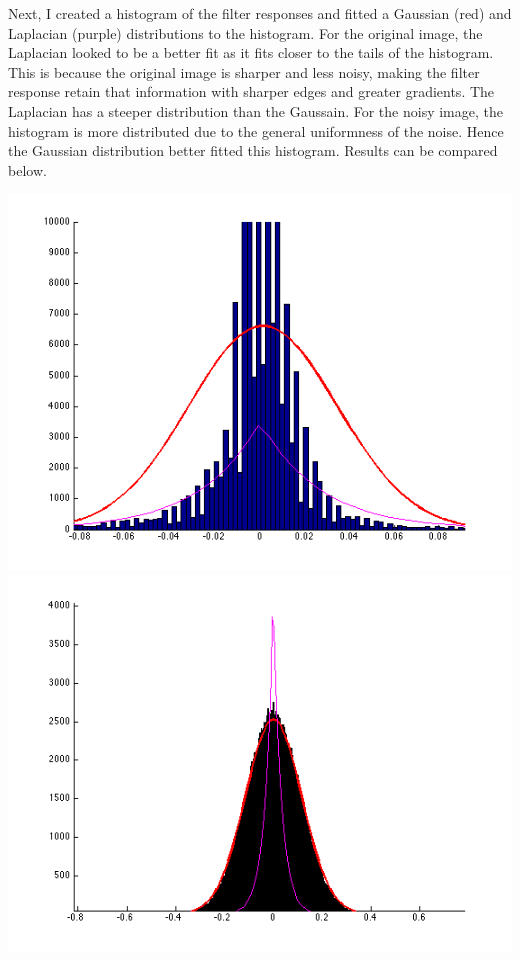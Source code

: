 \documentclass[12pt,twoside]{article}
\begin{document}
Next, I created a histogram of the filter responses and fitted a Gaussian (red) and Laplacian (purple) distributions to the histogram.  For the original image, the Laplacian looked to be a better fit as it fits closer to the tails of the histogram.  This is because the original image is sharper and less noisy, making the filter response retain that information with sharper edges and greater gradients.  The Laplacian has a steeper distribution than the Gaussain.  For the noisy image, the histogram is more distributed due to the general uniformness of the noise. Hence the Gaussian distribution better fitted this histogram.  Results can be compared below. 
\newline

\hspace{-50pt}
    \includegraphics[scale=.5]{4_3a} \includegraphics[scale=.5]{4_3g} 
  \newline
\end{document}
